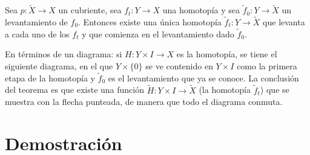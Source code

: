 \documentclass[11pt]{article}
\begin{document}
\begin{teo}\label{teo:levantamiento-homotopias}
Sea $p\colon\tilde X\to X$ un cubriente, sea $f_t\colon Y\to X$ una homotopía y sea $\tilde f_0\colon Y\to\tilde X$ un levantamiento de $f_0$. Entonces existe una única homotopía $\tilde f_t\colon Y\to\tilde X$ que levanta a cada uno de los $f_t$ y que comienza en el levantamiento dado $\tilde f_0$.
\end{teo}

En términos de un diagrama: si $H\colon Y\times I\to X$ es la homotopía, se tiene el siguiente diagrama, en el que $Y\times\{0\}$ se ve contenido en $Y\times I$ como la primera etapa de la homotopía y $\tilde f_0$ es el levantamiento que ya se conoce. La conclusión del teorema es que existe una función $\tilde H\colon Y\times I\to\tilde X$ (la homotopía $\tilde f_t$) que se muestra con la flecha punteada, de manera que todo el diagrama conmuta.

\begin{center}
\end{center}

\section*{Demostración}
\end{document}
